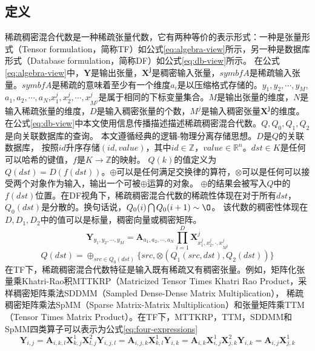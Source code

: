 \subsection{定义}
稀疏稠密混合代数是一种稀疏张量代数，它有两种等价的表示形式：一种是张量形式（Tensor formulation，简称TF）如公式\eqref{eq:algebra-view}所示，另一种是数据库形式（Database formulation，简称DF）如公式\eqref{eq:db-view}所示。
在公式\eqref{eq:algebra-view}中，$\symbf{Y}$是输出张量，$\symbf{X^j}$是稠密输入张量，$symbf{A}$是稀疏输入张量。$symbf{A}$是稀疏的意味着至少有一个维度$a_i$是以压缩格式存储的。$y_1, y_2,\cdots,y_M$,$a_1, a_2,\cdots,a_N$,$x_1^j,x_2^j,\cdots,x_{M^j}^j$是属于相同的下标变量集合。$M$是输出张量的维度，$N$是输入稀疏张量的维度，$D$是输入稠密张量的个数，$M^j$是输入稠密张量$\symbf{X^j}$的维度。
在公式\eqref{eq:db-view}中本文使用信息传播描述描述稀疏稠密混合代数。$Q,Q_0,Q_1,Q_2$是向关联数据库的查询。
本文遵循经典的逻辑-物理分离存储思想\cite{codd1970relational}。$D$是$Q$的关联数据库，
按照$id$升序存储$(id, value)$，其中$id\in \mathbb{Z}$，$value \in \mathbb{R}^n$。$dst\in K$是任何可以哈希的键值，$f$是$K\rightarrow \mathbb{Z}$的映射。
$Q(k)$的值定义为$Q(dst)=D(f(dst))$。$\oplus$可以是任何满足交换律的算符，$\otimes$可以是任何可以接受两个对象作为输入，输出一个可被$\oplus$运算的对象。
$\oplus$的结果会被写入$Q$中的$f(dst)$位置。在DF视角下，稀疏稠密混合代数的稀疏性体现在对于所有$dst$，$Q_0(dst)$是分散的。换句话说，$Q_0(i) \bigcap Q_0(i+1) \sim \O$。
该代数的稠密性体现在$D,D_1,D_2$中的值可以是标量，稠密向量或稠密矩阵。
\begin{equation}
  \symbf{Y}_{y_1, y_2,\cdots,y_M} = \symbf{A}_{a_1, a_2,\cdots,a_N}\prod_{i=1}^{D}\symbf{X}^{j}_{x_1^j,x_2^j,\cdot,x_{M^j}^j}
  \label{eq:algebra-view}
\end{equation}
\begin{equation}
  Q(dst)=\oplus_{src\in Q_0(dst)}\{src, \otimes(Q_1(src,dst), Q_2(dst))\}
  \label{eq:db-view}
\end{equation}
在TF下，稀疏稠密混合代数特征是输入既有稀疏又有稠密张量。例如，矩阵化张量乘Khatri-Rao积MTTKRP（Matricized Tensor Times Khatri Rao Product\cite{nisa2019mttkrp}，采样稠密矩阵乘法SDDMM（Sampled Dense-Dense Matrix Multiplication）\cite{yu2021exploiting}，
稀疏稠密矩阵乘法SpMM（Sparse Matrix-Matrix Multiplication）\cite{huang2020ge}和张量矩阵乘TTM（Tensor Times Matrix Product）\cite{kurt2022ttm}。在TF下，MTTKRP，TTM，SDDMM和SpMM四类算子可以表示为公式\eqref{eq:four-expressions}
\begin{subequations}
  \begin{equation}
      \symbf{Y}_{i,j} = \symbf{A}_{i,k,l}\symbf{X}_{k,j}^1\symbf{X}_{l,j}^2
  \end{equation}
  \begin{equation}
      \symbf{Y}_{i,j,l} = \symbf{A}_{i,j,k}\symbf{X}_{k,l}^1
  \end{equation}
  \begin{equation}
      \symbf{Y}_{i,k} = \symbf{A}_{i,k}\symbf{X}_{i,j}^1\symbf{X}_{j,k}^2
  \end{equation}
  \begin{equation}
      \symbf{Y}_{i,k} = \symbf{A}_{i,j}\symbf{X}_{j,k}^1
  \end{equation}
  \label{eq:four-expressions}
\end{subequations}
